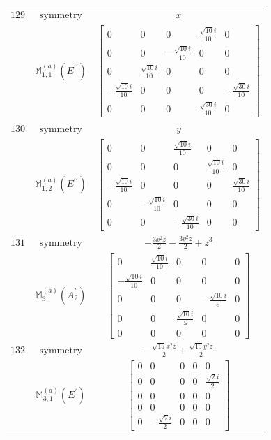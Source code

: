 \documentclass[fleqn,8pt,landscape]{jsarticle}
\begin{document}
\begin{longtable}{ccc}
$ 129 $ & $ \text{symmetry} $ & $ x $ \\
$  $ & $ \mathbb{M}_{1,1}^{(a)}(E^{\prime\prime}) $ & $ \begin{bmatrix} 0 & 0 & 0 & \frac{\sqrt{10} i}{10} & 0 \\ 0 & 0 & - \frac{\sqrt{10} i}{10} & 0 & 0 \\ 0 & \frac{\sqrt{10} i}{10} & 0 & 0 & 0 \\ - \frac{\sqrt{10} i}{10} & 0 & 0 & 0 & - \frac{\sqrt{30} i}{10} \\ 0 & 0 & 0 & \frac{\sqrt{30} i}{10} & 0 \end{bmatrix} $ \\ \hline
$ 130 $ & $ \text{symmetry} $ & $ y $ \\
$  $ & $ \mathbb{M}_{1,2}^{(a)}(E^{\prime\prime}) $ & $ \begin{bmatrix} 0 & 0 & \frac{\sqrt{10} i}{10} & 0 & 0 \\ 0 & 0 & 0 & \frac{\sqrt{10} i}{10} & 0 \\ - \frac{\sqrt{10} i}{10} & 0 & 0 & 0 & \frac{\sqrt{30} i}{10} \\ 0 & - \frac{\sqrt{10} i}{10} & 0 & 0 & 0 \\ 0 & 0 & - \frac{\sqrt{30} i}{10} & 0 & 0 \end{bmatrix} $ \\ \hline
$ 131 $ & $ \text{symmetry} $ & $ - \frac{3 x^{2} z}{2} - \frac{3 y^{2} z}{2} + z^{3} $ \\
$  $ & $ \mathbb{M}_{3}^{(a)}(A_{2}^{\prime}) $ & $ \begin{bmatrix} 0 & \frac{\sqrt{10} i}{10} & 0 & 0 & 0 \\ - \frac{\sqrt{10} i}{10} & 0 & 0 & 0 & 0 \\ 0 & 0 & 0 & - \frac{\sqrt{10} i}{5} & 0 \\ 0 & 0 & \frac{\sqrt{10} i}{5} & 0 & 0 \\ 0 & 0 & 0 & 0 & 0 \end{bmatrix} $ \\ \hline
$ 132 $ & $ \text{symmetry} $ & $ - \frac{\sqrt{15} x^{2} z}{2} + \frac{\sqrt{15} y^{2} z}{2} $ \\
$  $ & $ \mathbb{M}_{3,1}^{(a)}(E^{\prime}) $ & $ \begin{bmatrix} 0 & 0 & 0 & 0 & 0 \\ 0 & 0 & 0 & 0 & \frac{\sqrt{2} i}{2} \\ 0 & 0 & 0 & 0 & 0 \\ 0 & 0 & 0 & 0 & 0 \\ 0 & - \frac{\sqrt{2} i}{2} & 0 & 0 & 0 \end{bmatrix} $ \\ \hline

\end{longtable}
\end{document}

